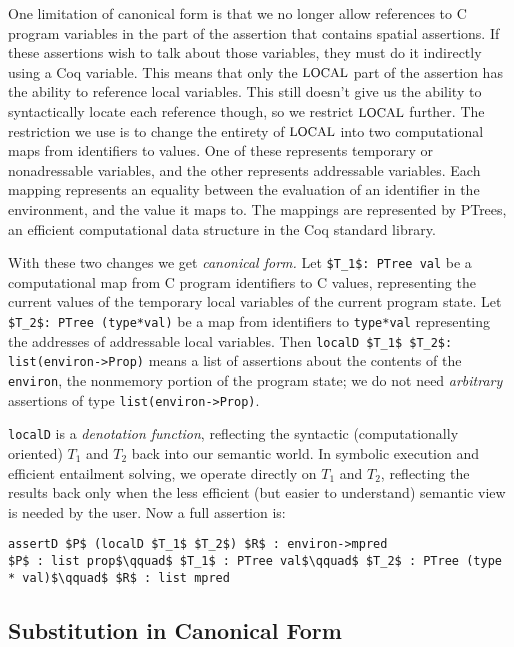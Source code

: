 \documentclass{puthesis}
\begin{document}
One limitation of canonical form is that we no longer allow
references to C program variables in the part of the assertion that
contains spatial assertions. If these assertions wish to talk
about those variables, they must do it indirectly using a Coq variable.
This means that only the $\mbox{\small LOCAL}$ part of the assertion has the ability
to reference local variables. This still doesn't give us the ability to
syntactically locate each reference though, so we restrict $\mbox{\small LOCAL}$
further. The restriction we use is to change the entirety of 
$\mbox{\small LOCAL}$ into two computational maps from identifiers to values.
One of these represents temporary or nonadressable variables, and 
the other represents addressable variables. Each mapping represents
an equality between the evaluation of an identifier in the
environment, and the value it maps to. The mappings are represented by PTrees,
an efficient
computational data structure in the Coq standard library. 

With these two changes we get \emph{canonical form.}
Let \lstinline{$T_1$: PTree val} be a computational map from
C program identifiers to C values,
representing the current values of the temporary local
variables of the current program state. Let
\lstinline{$T_2$: PTree (type*val)}
be a map from identifiers to \lstinline{type*val}
representing the addresses of addressable local variables.
Then \lstinline{localD $T_1$ $T_2$: list(environ->Prop)}
means a list of assertions about the contents of the \lstinline{environ},
the nonmemory portion of the program state;
we do not need \emph{arbitrary} 
assertions of type \lstinline{list(environ->Prop)}.

\lstinline{localD} is a \emph{denotation function},
reflecting the syntactic (computationally oriented) $T_1$ and $T_2$
back into our semantic world.  In symbolic execution
and efficient entailment solving, we operate directly on 
$T_1$ and $T_2$, reflecting the results back only when the 
less efficient (but easier to understand) semantic view is
needed by the user. Now a full assertion is:

\begin{lstlisting}
assertD $P$ (localD $T_1$ $T_2$) $R$ : environ->mpred
$P$ : list prop$\qquad$ $T_1$ : PTree val$\qquad$ $T_2$ : PTree (type * val)$\qquad$ $R$ : list mpred
\end{lstlisting}

\subsection{Substitution in Canonical Form}
\end{document}
